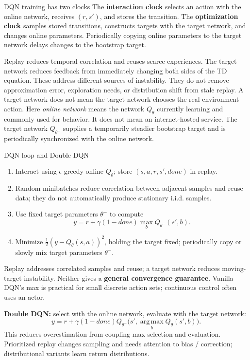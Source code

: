 \documentclass[10pt,a4paper]{article}
\newcommand{\argmax}{\operatorname*{arg\,max}}
\begin{document}
\begin{card}{DQN training has two clocks}
The \textbf{interaction clock} selects an action with the online network, receives $(r,s')$, and stores the transition. The \textbf{optimization clock} samples stored transitions, constructs targets with the target network, and changes online parameters. Periodically copying online parameters to the target network delays changes to the bootstrap target.

Replay reduces temporal correlation and reuses scarce experiences. The target network reduces feedback from immediately changing both sides of the TD equation. These address different sources of instability. They do not remove approximation error, exploration needs, or distribution shift from stale replay. A target network does not mean the target network chooses the real environment action.
Here \emph{online network} means the network $Q_\theta$ currently learning and commonly used for behavior. It does not mean an internet-hosted service. The target network $Q_{\theta^-}$ supplies a temporarily steadier bootstrap target and is periodically synchronized with the online network.
\end{card}
\begin{card}{DQN loop and Double DQN}
\begin{enumerate}
\item Interact using $\epsilon$-greedy online $Q_\theta$; store $(s,a,r,s',done)$ in replay.
\item Random minibatches reduce correlation between adjacent samples and reuse data; they do not automatically produce stationary i.i.d. samples.
\item Use fixed target parameters $\theta^-$ to compute
\[
y=r+\gamma(1-done)\max_bQ_{\theta^-}(s',b).
\]
\item Minimize $\frac12(y-Q_\theta(s,a))^2$, holding the target fixed; periodically copy or slowly mix target parameters $\theta^-$.
\end{enumerate}
Replay addresses correlated samples and reuse; a target network reduces moving-target instability. Neither gives a \textbf{general convergence guarantee}. Vanilla DQN's max is practical for small discrete action sets; continuous control often uses an actor.

\textbf{Double DQN:} select with the online network, evaluate with the target network:
\[
y=r+\gamma(1-done)Q_{\theta^-}\bigl(s',\argmax_bQ_\theta(s',b)\bigr).
\]
This reduces overestimation from coupling max selection and evaluation. Prioritized replay changes sampling and needs attention to bias / correction; distributional variants learn return distributions.
\end{card}
\end{document}
